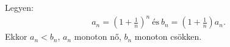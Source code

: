    Legyen:
   \begin{gather*}
      a_{n} = {\left( 1+\frac{1}{n}\right)}^{n} \ \text{és} \ 
      b_{n} = \left( 1+\frac{1}{n}\right) a_{n}.
   \end{gather*}
   Ekkor $a_{n}<b_{n}$, $a_{n}$ monoton nő, $b_{n}$ monoton csökken.
